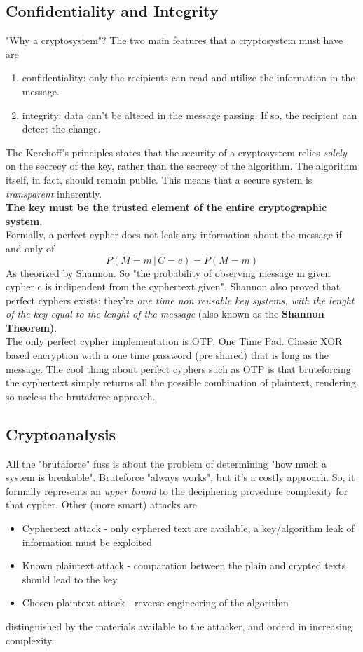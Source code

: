 \documentclass{article}
\begin{document}
			\subsection{Confidentiality and Integrity}
				"Why a cryptosystem"? The two main features that a cryptosystem must have are
				\begin{enumerate}
					\item confidentiality: only the recipients can read and utilize the information in the message.
					\item integrity: data can't be altered in the message passing. If so, the recipient can detect the change.
				\end{enumerate}
				The Kerchoff's principles states that the security of a cryptosystem relies \emph{solely} on the secrecy of the key, rather than the secrecy of the algorithm. The algorithm itself, in fact, should remain public. This means that a secure system is \emph{transparent} inherently.\\
				\textbf{The key must be the trusted element of the entire cryptographic system}.\\
				Formally, a perfect cypher does not leak any information about the message if and only of
				\begin{equation}
					P(M=m \,\vert\, C=c) = P(M=m)
				\end{equation}
				As theorized by Shannon. So "the probability of observing message m given cypher c is indipendent from the cyphertext given". Shannon also proved that perfect cyphers exists: they're \emph{one time non reusable key systems, with the lenght of the key equal to the lenght of the message} (also known as the \textbf{Shannon Theorem)}.\\
				The only perfect cypher implementation is OTP, One Time Pad. Classic XOR based encryption with a one time password (pre shared) that is long as the message. The cool thing about perfect cyphers such as OTP is that bruteforcing the cyphertext simply returns all the possible combination of plaintext, rendering so useless the brutaforce approach.
			
			\subsection{Cryptoanalysis}
				All the "brutaforce" fuss is about the problem of determining "how much a system is breakable". Bruteforce "always works", but it's a costly approach. So, it formally represents an \emph{upper bound} to the deciphering provedure complexity for that cypher. Other (more smart) attacks are 
				\begin{itemize}
					\item Cyphertext attack - only cyphered text are available, a key/algorithm leak of information must be exploited
					\item Known plaintext attack - comparation between the plain and crypted texts should lead to the key
					\item Chosen plaintext attack - reverse engineering of the algorithm
				\end{itemize}
				distinguished by the materials available to the attacker, and orderd in increasing complexity.
				
\end{document}

